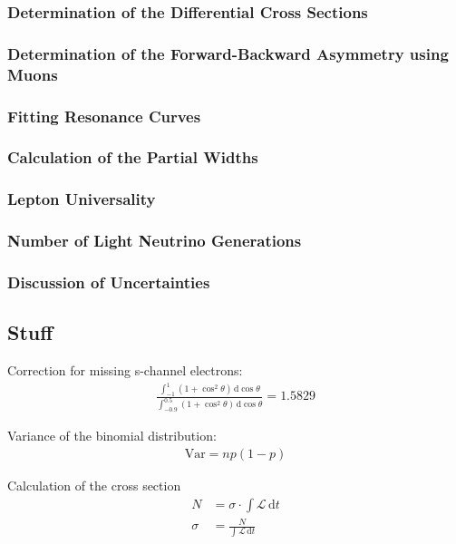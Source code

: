 \documentclass[11pt, a4paper]{article}
\numberwithin{equation}{section}
\newcommand\dinf[1]{ \,\mathrm{d}#1 }
\begin{document}
\subsubsection{Determination of the Differential Cross Sections}

\subsubsection{Determination of the Forward-Backward Asymmetry using Muons}

\subsubsection{Fitting Resonance Curves}

\subsubsection{Calculation of the Partial Widths}

\subsubsection{Lepton Universality}

\subsubsection{Number of Light Neutrino Generations}

\subsubsection{Discussion of Uncertainties}

\subsection{Stuff}

Correction for missing s-channel electrons:
\begin{align*}
\frac{\int_{-1}^{1}(1 + \cos^2\theta) \dinf{\cos\theta}}{\int_{-0.9}^{0.5}(1 + \cos^2\theta) \dinf{\cos\theta}} = 1.5829
\end{align*}


Variance of the binomial distribution:
\begin{align*}
	\mathrm{Var} = n p (1 - p) 
\end{align*}


Calculation of the cross section
\begin{align*}
	N &= \sigma \cdot \int \mathcal{L} \dinf{t}\\
	\sigma &= \frac{N}{\int \mathcal{L} \dinf{t}}
\end{align*}
\end{document}
